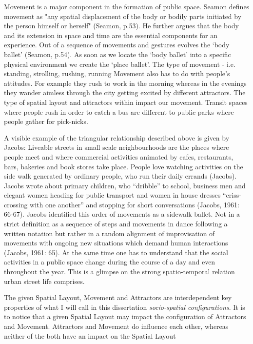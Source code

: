 Movement is a major component in the formation of public space.
Seamon defines movement as "any spatial displacement of the body or bodily parts initiated by the person himself or herself" (Seamon, p.53). 
He further argues that the body and its extension in space and time are the essential components for an experience. Out of a sequence of movements and gestures evolves the ‘body ballet’ (Seamon, p.54). 
As soon as we locate the ‘body ballet’ into a specific physical environment we create the ‘place ballet’.
The type of movement - i.e. standing, strolling, rushing, running
Movement also has to do with people's attitudes. For example they rush to work in the morning whereas in the evenings they wander aimless through the city getting excited by different attractors.
The type of spatial layout and attractors within impact our movement. Transit spaces where people rush in order to catch a bus are different to public parks where people gather for pick-nicks.



A visible example of the triangular relationship described above is given by Jacobs:
Liveable streets in small scale neighbourhoods are the places where people meet and where commercial activities animated by cafes, restaurants, bars, bakeries and book stores take place. 
People love watching activities on the side walk generated by ordinary people, who run their daily errands (Jacobs). 
Jacobs wrote about primary children, who “dribble” to school, business men and elegant women heading for public transport and women in house dresses “criss-crossing with one another” and stopping for short conversations (Jacobs, 1961: 66-67). Jacobs identified this order of movements as a sidewalk ballet.
Not in a strict definition as a sequence of steps and movements in dance following a written notation but rather in a random alignment of improvisation of movements with ongoing new situations which demand human interactions (Jacobs, 1961: 65). 
At the same time one has to understand that the social activities in a public space change during the course of a day and even throughout the year.   
This is a glimpse on the strong spatio-temporal relation urban street life comprises. 



The given Spatial Layout, Movement and Attractors are interdependent key properties of what I will call in this dissertation \textit{socio-spatial configurations}. It is to notice that a given Spatial Layout may impact the configuration of Attractors and Movement. Attractors and Movement do influence each other, whereas neither of the both have an impact on the Spatial Layout 


